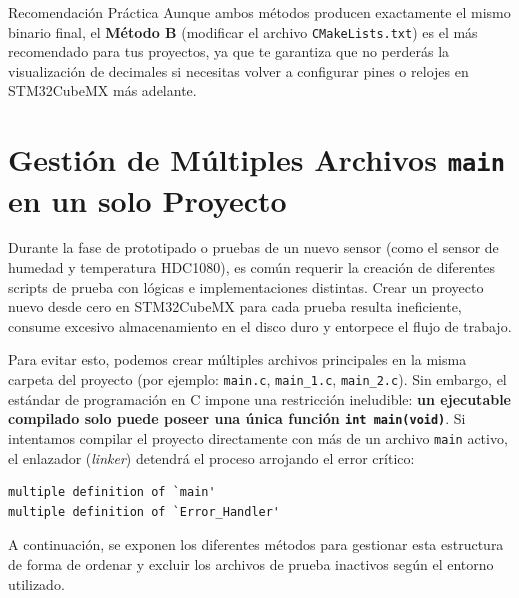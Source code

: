 \documentclass[
10pt, %
a4paper, %
oneside, %
headinclude,footinclude, %
BCOR5mm, %
]{scrartcl}
\begin{document}
\begin{InfoBox}{Recomendación Práctica}
	Aunque ambos métodos producen exactamente el mismo binario final, el \textbf{Método B} (modificar el archivo \texttt{CMakeLists.txt}) es el más recomendado para tus proyectos, ya que te garantiza que no perderás la visualización de decimales si necesitas volver a configurar pines o relojes en STM32CubeMX más adelante.
\end{InfoBox}

\newpage
\section{Gestión de Múltiples Archivos \texttt{main} en un solo Proyecto}

Durante la fase de prototipado o pruebas de un nuevo sensor (como el sensor de humedad y temperatura HDC1080), es común requerir la creación de diferentes scripts de prueba con lógicas e implementaciones distintas. Crear un proyecto nuevo desde cero en STM32CubeMX para cada prueba resulta ineficiente, consume excesivo almacenamiento en el disco duro y entorpece el flujo de trabajo.

Para evitar esto, podemos crear múltiples archivos principales en la misma carpeta del proyecto (por ejemplo: \texttt{main.c}, \texttt{main\_1.c}, \texttt{main\_2.c}). Sin embargo, el estándar de programación en C impone una restricción ineludible: \textbf{un ejecutable compilado solo puede poseer una única función \texttt{int main(void)}}. Si intentamos compilar el proyecto directamente con más de un archivo \texttt{main} activo, el enlazador (\textit{linker}) detendrá el proceso arrojando el error crítico:
\begin{lstlisting}[language=DOS]
multiple definition of `main'
multiple definition of `Error_Handler'
\end{lstlisting}
A continuación, se exponen los diferentes métodos para gestionar esta estructura de forma de ordenar y excluir los archivos de prueba inactivos según el entorno utilizado.
\end{document}
